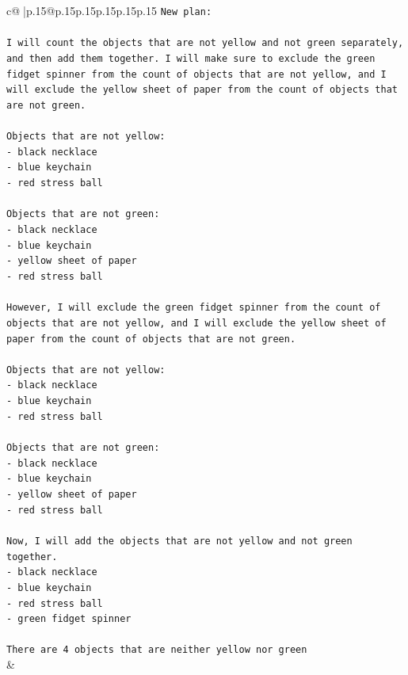 \documentclass{article}
\begin{document}
{\begin{supertabular}{c@{$\;$}|p{.15\linewidth}@{}p{.15\linewidth}p{.15\linewidth}p{.15\linewidth}p{.15\linewidth}p{.15\linewidth}}
{{{\texttt{New plan: } \\
\\ 
\texttt{I will count the objects that are not yellow and not green separately, and then add them together. I will make sure to exclude the green fidget spinner from the count of objects that are not yellow, and I will exclude the yellow sheet of paper from the count of objects that are not green. } \\
\\ 
\texttt{Objects that are not yellow: } \\
\texttt{{-} black necklace} \\
\texttt{{-} blue keychain} \\
\texttt{{-} red stress ball} \\
\\ 
\texttt{Objects that are not green: } \\
\texttt{{-} black necklace} \\
\texttt{{-} blue keychain} \\
\texttt{{-} yellow sheet of paper} \\
\texttt{{-} red stress ball} \\
\\ 
\texttt{However, I will exclude the green fidget spinner from the count of objects that are not yellow, and I will exclude the yellow sheet of paper from the count of objects that are not green. } \\
\\ 
\texttt{Objects that are not yellow: } \\
\texttt{{-} black necklace} \\
\texttt{{-} blue keychain} \\
\texttt{{-} red stress ball} \\
\\ 
\texttt{Objects that are not green: } \\
\texttt{{-} black necklace} \\
\texttt{{-} blue keychain} \\
\texttt{{-} yellow sheet of paper} \\
\texttt{{-} red stress ball} \\
\\ 
\texttt{Now, I will add the objects that are not yellow and not green together. } \\
\texttt{{-} black necklace} \\
\texttt{{-} blue keychain} \\
\texttt{{-} red stress ball} \\
\texttt{{-} green fidget spinner} \\
\\ 
\texttt{There are 4 objects that are neither yellow nor green} \\
            }
        }
    }
    & \\ \\

\end{supertabular}
}
\end{document}
